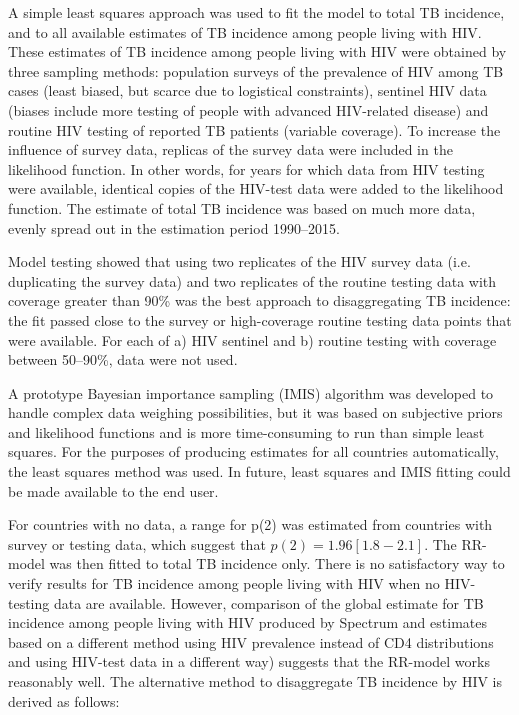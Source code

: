 A simple least squares approach was used to fit the model to total TB incidence, and to all available estimates of TB incidence among people living with HIV. These estimates of TB incidence among people living with HIV were obtained by three sampling methods: population surveys of the prevalence of HIV among TB cases (least biased, but scarce due to logistical constraints), sentinel HIV data (biases include more testing of people with advanced HIV-related disease) and routine HIV testing of reported TB patients (variable coverage). To increase the influence of survey data, replicas of the survey data were included in the likelihood function. In other words, for years for which data from HIV testing were available, identical copies of the HIV-test data were added to the likelihood function. The estimate of total TB incidence was based on much more data, evenly spread out in the estimation period 1990–2015.

Model testing showed that using two replicates of the HIV survey data (i.e. duplicating the survey data) and two replicates of the routine testing data with coverage greater than 90\% was the best approach to disaggregating TB incidence: the fit passed close to the survey or high-coverage routine testing data points that were available. For each of a) HIV sentinel and b) routine testing with coverage between 50–90\%, data were not used.

A prototype Bayesian importance sampling (IMIS) algorithm was developed to handle complex data weighing possibilities, but it was based on subjective priors and likelihood functions and is more time-consuming to run than simple least squares. For the purposes of producing estimates for all countries automatically, the least squares method was used. In future, least squares and IMIS fitting could be made available to the end user.


For countries with no data, a range for p(2) was estimated from countries with survey or testing data, which suggest that $p(2) = 1.96 [1.8-2.1]$. The RR-model was then fitted to total TB incidence only. There is no satisfactory way to verify results for TB incidence among people living with HIV when no HIV-testing data are available. However, comparison of the global estimate for TB incidence among people living with HIV produced by Spectrum and estimates based on a different method using HIV prevalence instead of CD4 distributions and using  HIV-test data in a different way) suggests that the RR-model works reasonably well. The alternative method to disaggregate TB incidence by HIV is derived as follows:

